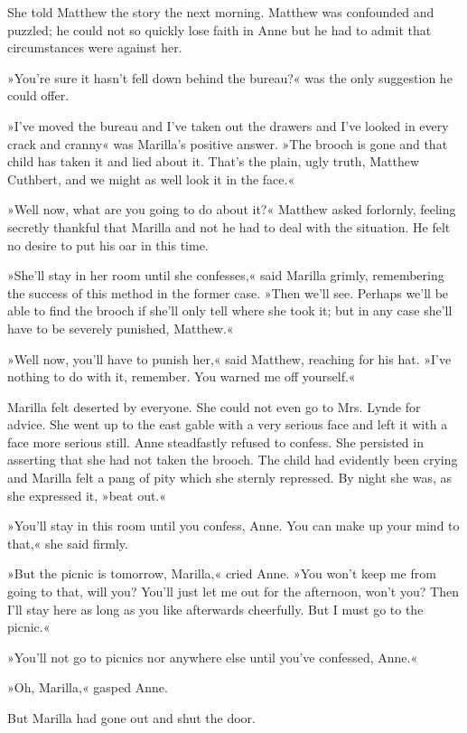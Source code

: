 She told Matthew the story the next morning. Matthew was confounded and puzzled; he could not so quickly lose faith in Anne but he had to admit that circumstances were against her.

»You're sure it hasn't fell down behind the bureau?« was the only suggestion he could offer.

»I've moved the bureau and I've taken out the drawers and I've looked in every crack and cranny« was Marilla's positive answer. »The brooch is gone and that child has taken it and lied about it. That's the plain, ugly truth, Matthew Cuthbert, and we might as well look it in the face.«

»Well now, what are you going to do about it?« Matthew asked forlornly, feeling secretly thankful that Marilla and not he had to deal with the situation. He felt no desire to put his oar in this time.

»She'll stay in her room until she confesses,« said Marilla grimly, remembering the success of this method in the former case. »Then we'll see. Perhaps we'll be able to find the brooch if she'll only tell where she took it; but in any case she'll have to be severely punished, Matthew.«

»Well now, you'll have to punish her,« said Matthew, reaching for his hat. »I've nothing to do with it, remember. You warned me off yourself.«

Marilla felt deserted by everyone. She could not even go to Mrs. Lynde for advice. She went up to the east gable with a very serious face and left it with a face more serious still. Anne steadfastly refused to confess. She persisted in asserting that she had not taken the brooch. The child had evidently been crying and Marilla felt a pang of pity which she sternly repressed. By night she was, as she expressed it, »beat out.«

»You'll stay in this room until you confess, Anne. You can make up your mind to that,« she said firmly.

»But the picnic is tomorrow, Marilla,« cried Anne. »You won't keep me from going to that, will you? You'll just let me out for the afternoon, won't you? Then I'll stay here as long as you like afterwards cheerfully. But I must go to the picnic.«

»You'll not go to picnics nor anywhere else until you've confessed, Anne.«

»Oh, Marilla,« gasped Anne.

But Marilla had gone out and shut the door.

